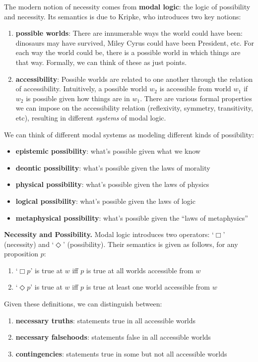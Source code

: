 \begin{slide}
The modern notion of necessity comes from \textbf{modal logic}: the logic of possibility and necessity. Its semantics is due to Kripke, who introduces two key notions:
\begin{enumerate}
  \item \textbf{possible worlds}: There are innumerable ways the world could have been: dinosaurs may have survived, Miley Cyrus could have been President, etc. For each way the world could be, there is a possible world in which things are that way. Formally, we can think of these as just points.
  \item \textbf{accessibility}: Possible worlds are related to one another through the relation of accessibility. Intuitively, a possible world $w_2$ is accessible from world $w_1$ if $w_2$ is possible given how things are in $w_1$. There are various formal properties we can impose on the accessibility relation (reflexivity, symmetry, transitivity, etc), resulting in different \emph{systems} of modal logic.
\end{enumerate}
We can think of different modal systems as modeling different kinds of possibility:
\begin{itemize}
  \item \textbf{epistemic possibility}: what's possible given what we know
  \item \textbf{deontic possibility}: what's possible given the laws of morality
  \item \textbf{physical possibility}: what's possible given the laws of physics
  \item \textbf{logical possibility}: what's possible given the laws of logic
  \item \textbf{metaphysical possibility}: what's possible given the ``laws of metaphysics''
\end{itemize}
\end{slide}

\begin{slide}
\textbf{Necessity and Possibility.} Modal logic introduces two operators: `$\Box$' (necessity) and `$\Diamond$' (possibility). Their semantics is given as follows, for any proposition $p$:
\begin{enumerate}
  \item `$\Box p$' is true at $w$ iff $p$ is true at all worlds accessible from $w$
  \item `$\Diamond p$' is true at $w$ iff $p$ is true at least one world accessible from $w$
\end{enumerate}
Given these definitions, we can distinguish between:
\begin{enumerate}
  \item \textbf{necessary truths}: statements true in all accessible worlds
  \item \textbf{necessary falsehoods}: statements false in all accessible worlds
  \item \textbf{contingencies}: statements true in some but not all accessible worlds
\end{enumerate}
\end{slide}

